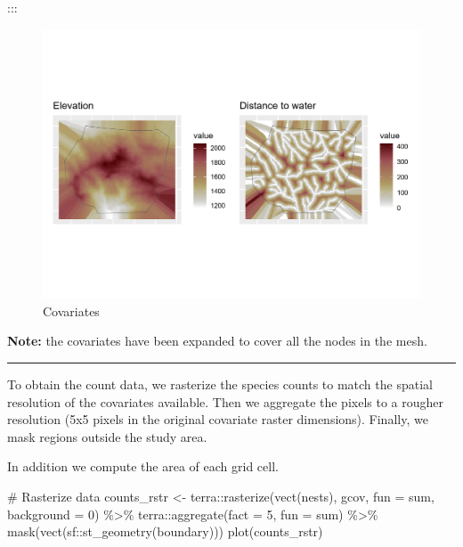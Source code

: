 \documentclass[
  letterpaper,
  DIV=11,
  numbers=noendperiod]{scrartcl}
\newenvironment{Shaded}{\begin{snugshade}}{\end{snugshade}}
\newcommand{\AttributeTok}[1]{\textcolor[rgb]{0.40,0.45,0.13}{#1}}
\newcommand{\CommentTok}[1]{\textcolor[rgb]{0.37,0.37,0.37}{#1}}
\newcommand{\DecValTok}[1]{\textcolor[rgb]{0.68,0.00,0.00}{#1}}
\newcommand{\FunctionTok}[1]{\textcolor[rgb]{0.28,0.35,0.67}{#1}}
\newcommand{\NormalTok}[1]{\textcolor[rgb]{0.00,0.23,0.31}{#1}}
\newcommand{\OtherTok}[1]{\textcolor[rgb]{0.00,0.23,0.31}{#1}}
\newcommand{\SpecialCharTok}[1]{\textcolor[rgb]{0.37,0.37,0.37}{#1}}
\begin{document}
:::

\begin{figure}[H]

{\centering \includegraphics[width=0.8\linewidth,height=\textheight,keepaspectratio]{day5_practical_8_files/figure-pdf/unnamed-chunk-64-1.png}

}

\caption{Covariates}

\end{figure}%

\textbf{Note:} the covariates have been expanded to cover all the nodes
in the mesh.

\begin{center}\rule{0.5\linewidth}{0.5pt}\end{center}

To obtain the count data, we rasterize the species counts to match the
spatial resolution of the covariates available. Then we aggregate the
pixels to a rougher resolution (5x5 pixels in the original covariate
raster dimensions). Finally, we mask regions outside the study area.

In addition we compute the area of each grid cell.

\begin{Shaded}
\begin{Highlighting}[]
\CommentTok{\# Rasterize data}
\NormalTok{counts\_rstr }\OtherTok{\textless{}{-}}
\NormalTok{  terra}\SpecialCharTok{::}\FunctionTok{rasterize}\NormalTok{(}\FunctionTok{vect}\NormalTok{(nests), gcov, }\AttributeTok{fun =}\NormalTok{ sum, }\AttributeTok{background =} \DecValTok{0}\NormalTok{) }\SpecialCharTok{\%\textgreater{}\%}
\NormalTok{  terra}\SpecialCharTok{::}\FunctionTok{aggregate}\NormalTok{(}\AttributeTok{fact =} \DecValTok{5}\NormalTok{, }\AttributeTok{fun =}\NormalTok{ sum) }\SpecialCharTok{\%\textgreater{}\%}
  \FunctionTok{mask}\NormalTok{(}\FunctionTok{vect}\NormalTok{(sf}\SpecialCharTok{::}\FunctionTok{st\_geometry}\NormalTok{(boundary)))}
\FunctionTok{plot}\NormalTok{(counts\_rstr)}
\end{Highlighting}
\end{Shaded}
\end{document}
